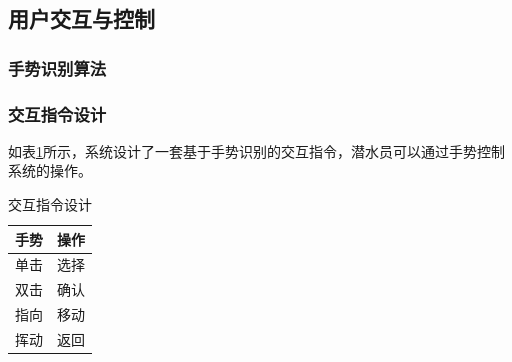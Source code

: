 \subsection{用户交互与控制}
\subsubsection{手势识别算法}
\subsubsection{交互指令设计}
如表\ref{tab:instruction}所示，系统设计了一套基于手势识别的交互指令，潜水员可以通过手势控制系统的操作。
\begin{table}
    \centering
    \caption{交互指令设计}
    \label{tab:instruction}
    \begin{tabular}{|c|c|}
    \hline
    手势 & 操作 \\
    \hline
    单击 & 选择 \\
    \hline
    双击 & 确认 \\
    \hline
    指向 & 移动 \\
    \hline
    挥动 & 返回 \\
    \hline
    \end{tabular}
\end{table}



